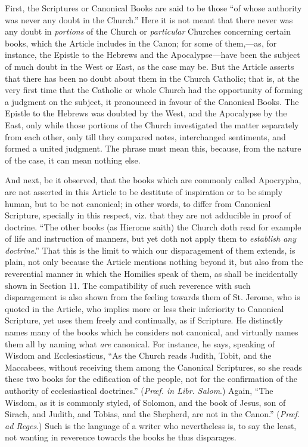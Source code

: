 First, the Scriptures or Canonical Books are said to be those
``of whose authority was never any doubt in the Church.'' Here
it is not meant that there never was any doubt in \emph{portions}
of the Church or \emph{particular} Churches concerning certain books, which
the Article includes in the Canon; for some of them,—as, for
instance, the Epistle to the Hebrews and the Apocalypse—have been
the subject of much doubt in the West or East, as the case may be. But
the Article asserts that there has been no doubt about them in the
Church Catholic; that is, at the very first time that the Catholic or
whole Church had the opportunity of forming a judgment on the subject,
it pronounced in favour of the Canonical Books. The Epistle to the
Hebrews was doubted by the West, and the Apocalypse by the East, only
while those portions of the Church investigated the matter separately
from each other, only till they compared notes, interchanged
sentiments, and formed a united judgment. The phrase must mean this,
because, from the nature of the case, it can mean nothing else.

And next, be it observed, that the books which are commonly called
Apocrypha, are not asserted in this Article to be destitute of
inspiration or to be simply human, but to be not canonical; in other
words, to differ from Canonical Scripture, specially in this respect,
viz. that they are not adducible in proof of doctrine. ``The other
books (as Hierome saith) the Church doth read for example of life and
instruction of manners, but yet doth not apply them to \emph{establish
any doctrine}.'' That this is the limit to which our
disparagement of them extends, is plain, not only because the Article
mentions nothing beyond it, but also from the reverential manner in
which the Homilies speak of them, as shall be incidentally shown in
Section 11. The compatibility of such reverence with such
disparagement is also shown from the feeling towards them of St.
Jerome, who is quoted in the Article, who implies more or less their
inferiority to Canonical Scripture, yet uses them freely and
continually, as if Scripture. He distinctly names many of the books
which he considers not canonical, and virtually names them all
by naming what \emph{are} canonical. For instance, he says, speaking of
Wisdom and Ecclesiasticus, ``As the Church reads Judith, Tobit,
and the Maccabees, without receiving them among the Canonical
Scriptures, so she reads these two books for the edification of the
people, not for the confirmation of the authority of ecclesiastical
doctrines.'' (\emph{Prœf. in Libr. Salom}.) Again, ``The
Wisdom, as it is commonly styled, of Solomon, and the book of Jesus,
son of Sirach, and Judith, and Tobias, and the Shepherd, are not in
the Canon.'' (\emph{Prœf. ad Reges}.) Such is the language of a
writer who nevertheless is, to say the least, not wanting in reverence
towards the books he thus disparages.

